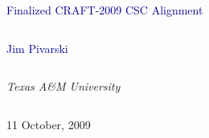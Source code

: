 \documentclass[compress]{beamer}
\begin{document}
\begin{frame}
\vfill
\begin{center}
\textcolor{darkblue}{\Large Finalized CRAFT-2009 CSC Alignment}

\vfill
\begin{columns}
\begin{center}
\large
\textcolor{darkblue}{Jim Pivarski}
\end{center}
\end{columns}

\begin{columns}
\begin{center}
\scriptsize
{\it Texas A\&M University}
\end{center}
\end{columns}

\vfill
11 October, 2009

\end{center}
\end{frame}


\small
\end{document}
